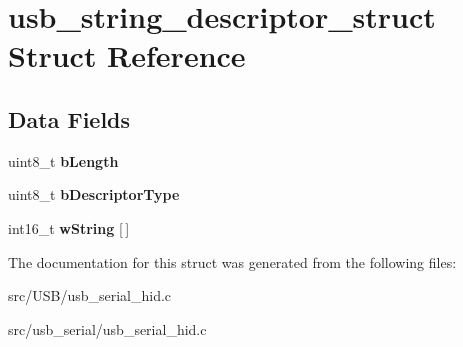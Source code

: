 \hypertarget{structusb__string__descriptor__struct}{\section{usb\-\_\-string\-\_\-descriptor\-\_\-struct Struct Reference}
\label{structusb__string__descriptor__struct}
}
\subsection*{Data Fields}
\begin{DoxyCompactItemize}
\item 
\hypertarget{structusb__string__descriptor__struct_a1deca1f1d6e5815b290e6e1015bce5b8}{uint8\-\_\-t {\bfseries b\-Length}}\label{structusb__string__descriptor__struct_a1deca1f1d6e5815b290e6e1015bce5b8}

\item 
\hypertarget{structusb__string__descriptor__struct_a67d7027b9eb9ed268d28e84fbc675707}{uint8\-\_\-t {\bfseries b\-Descriptor\-Type}}\label{structusb__string__descriptor__struct_a67d7027b9eb9ed268d28e84fbc675707}

\item 
\hypertarget{structusb__string__descriptor__struct_a4eda7ce8879c91ddd76861cf5a066f83}{int16\-\_\-t {\bfseries w\-String} \mbox{[}$\,$\mbox{]}}\label{structusb__string__descriptor__struct_a4eda7ce8879c91ddd76861cf5a066f83}

\end{DoxyCompactItemize}


The documentation for this struct was generated from the following files\-:\begin{DoxyCompactItemize}
\item 
src/\-U\-S\-B/usb\-\_\-serial\-\_\-hid.\-c\item 
src/usb\-\_\-serial/usb\-\_\-serial\-\_\-hid.\-c\end{DoxyCompactItemize}
